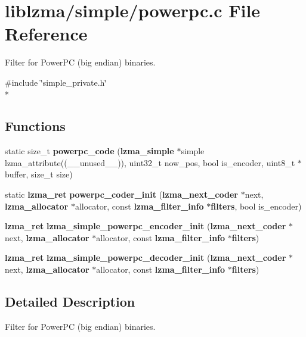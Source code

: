 \section{liblzma/simple/powerpc.c File Reference}
\label{powerpc_8c}


Filter for Power\-P\-C (big endian) binaries.  


{\ttfamily \#include \char`\"{}simple\-\_\-private.\-h\char`\"{}}\\*
\subsection*{Functions}
\begin{DoxyCompactItemize}
\item 
static size\-\_\-t {\bfseries powerpc\-\_\-code} ({\bf lzma\-\_\-simple} $\ast$simple lzma\-\_\-attribute((\-\_\-\-\_\-unused\-\_\-\-\_\-)), uint32\-\_\-t now\-\_\-pos, bool is\-\_\-encoder, uint8\-\_\-t $\ast$buffer, size\-\_\-t size)\label{powerpc_8c_a4efd576334a7099191d2124104073e10}

\item 
static {\bf lzma\-\_\-ret} {\bfseries powerpc\-\_\-coder\-\_\-init} ({\bf lzma\-\_\-next\-\_\-coder} $\ast$next, {\bf lzma\-\_\-allocator} $\ast$allocator, const {\bf lzma\-\_\-filter\-\_\-info} $\ast${\bf filters}, bool is\-\_\-encoder)\label{powerpc_8c_a53b686ede3a7da65e504df561d9e44a8}

\item 
{\bf lzma\-\_\-ret} {\bfseries lzma\-\_\-simple\-\_\-powerpc\-\_\-encoder\-\_\-init} ({\bf lzma\-\_\-next\-\_\-coder} $\ast$next, {\bf lzma\-\_\-allocator} $\ast$allocator, const {\bf lzma\-\_\-filter\-\_\-info} $\ast${\bf filters})\label{powerpc_8c_a73f37cd37022278bc0925d453b075435}

\item 
{\bf lzma\-\_\-ret} {\bfseries lzma\-\_\-simple\-\_\-powerpc\-\_\-decoder\-\_\-init} ({\bf lzma\-\_\-next\-\_\-coder} $\ast$next, {\bf lzma\-\_\-allocator} $\ast$allocator, const {\bf lzma\-\_\-filter\-\_\-info} $\ast${\bf filters})\label{powerpc_8c_af575ee7977199d36f9e224e676b05051}

\end{DoxyCompactItemize}


\subsection{Detailed Description}
Filter for Power\-P\-C (big endian) binaries. 